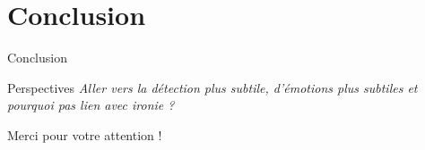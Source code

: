 \documentclass[11pt,aspectratio=169]{beamer}
\begin{document}
\section{Conclusion}

\begin{frame}{Conclusion}
    
\end{frame}

\begin{frame}{Perspectives}
    \emph{Aller vers la détection plus subtile, d'émotions plus subtiles et pourquoi pas lien avec ironie ?}
\end{frame}


\begin{frame}[plain]
    \begin{center}
        \vspace{0.2cm}
        {\color{deepblue}\Huge Merci pour votre attention !}
        
        \vspace{0.5cm}
        

\end{center}
\end{frame}
\end{document}
